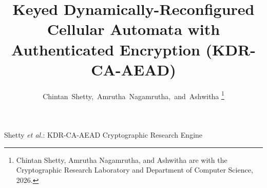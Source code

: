 \documentclass[10pt,journal,twocolumn]{IEEEtran}
\begin{document}
\title{Keyed Dynamically-Reconfigured Cellular Automata with Authenticated Encryption (KDR-CA-AEAD)}

\author{Chintan~Shetty,~Amrutha~Nagamrutha,~and~Ashwitha
\thanks{Chintan Shetty, Amrutha Nagamrutha, and Ashwitha are with the Cryptographic Research Laboratory and Department of Computer Science, 2026.}
}

%
{Shetty \MakeLowercase{\textit{et al.}}: KDR-CA-AEAD Cryptographic Research Engine}

\maketitle












\appendices





\end{document}
